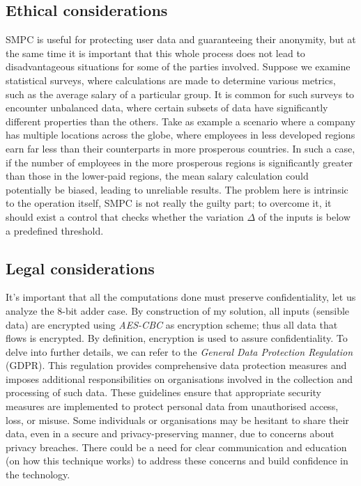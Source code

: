 \documentclass[12pt]{article}
\begin{document}
\subsection{Ethical considerations}
SMPC is useful for protecting user data and guaranteeing their anonymity, but at the same time it is important that this whole process does not lead to disadvantageous situations for some of the parties involved. Suppose we examine statistical surveys, where calculations are made to determine various metrics, such as the average salary of a particular group. It is common for such surveys to encounter unbalanced data, where certain subsets of data have significantly different properties than the others. Take as example a scenario where a company has multiple locations across the globe, where employees in less developed regions earn far less than their counterparts in more prosperous countries. In such a case, if the number of employees in the more prosperous regions is significantly greater than those in the lower-paid regions, the mean salary calculation could potentially be biased, leading to unreliable results. The problem here is intrinsic to the operation itself, SMPC is not really the guilty part; to overcome it, it should exist a control that checks whether the variation $\Delta$ of the inputs is below a predefined threshold.

\subsection{Legal considerations}
It's important that all the computations done must preserve confidentiality, let us analyze the 8-bit adder case. By construction of my solution, all inputs (sensible data) are encrypted using \textit{AES-CBC} as encryption scheme; thus all data that flows is encrypted. By definition, encryption is used to assure confidentiality. To delve into further details, we can refer to the \textit{General Data Protection Regulation} (GDPR). This regulation provides comprehensive data protection measures and imposes additional responsibilities on organisations involved in the collection and processing of such data. These guidelines ensure that appropriate security measures are implemented to protect personal data from unauthorised access, loss, or misuse. Some individuals or organisations may be hesitant to share their data, even in a secure and privacy-preserving manner, due to concerns about privacy breaches. There could be a need for clear communication and education (on how this technique works) to address these concerns and build confidence in the technology.
\end{document}
